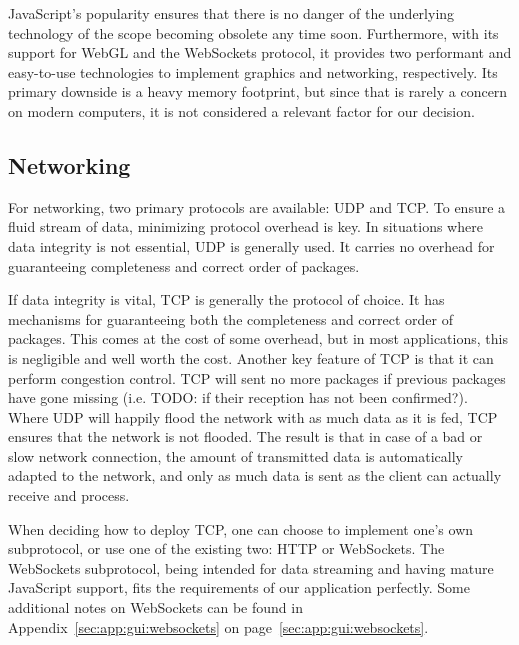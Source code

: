JavaScript's  popularity ensures  that there  is no  danger of  the underlying
technology  of  the  scope   becoming  obsolete  any  time  soon. Furthermore,
with  its support  for  WebGL and  the WebSockets  protocol,  it provides  two
performant and easy-to-use technologies  to implement graphics and networking,
respectively. Its primary downside is a heavy memory footprint, but since that
is  rarely a  concern on  modern computers,  it is  not considered  a relevant
factor for our decision.


%
%

\subsection{Networking} %
\label{subsec:gui:networking}

For networking, two primary protocols are available: UDP and TCP.  To ensure a
fluid stream of data, minimizing protocol overhead is key. In situations where
data integrity is not essential, UDP is generally used. It carries no overhead
for guaranteeing completeness and correct order of packages.

If data  integrity is vital, TCP  is generally the protocol  of choice. It has
mechanisms  for  guaranteeing  both  the completeness  and  correct  order  of
packages.  This comes at the cost  of some overhead, but in most applications,
this is negligible and well worth the cost. Another key feature of TCP is that
it can perform congestion control. TCP will  sent no more packages if previous
packages  have  gone missing  (i.e. TODO:  if  their  reception has  not  been
confirmed?).  Where UDP will happily flood the network with as much data as it
is fed,  TCP ensures that  the network is not  flooded. The result is  that in
case of a  bad or slow network  connection, the amount of  transmitted data is
automatically adapted  to the network,  and only as much  data is sent  as the
client can actually receive and process.

When  deciding how  to  deploy TCP,  one  can choose  to  implement one's  own
subprotocol,  or  use  one  of   the  existing  two: HTTP  or  WebSockets. The
WebSockets  subprotocol,   being  intended  for  data   streaming  and  having
mature  JavaScript   support,  fits   the  requirements  of   our  application
perfectly.    Some  additional   notes   on  WebSockets   can   be  found   in
Appendix~\ref{sec:app:gui:websockets} on page~\ref{sec:app:gui:websockets}.

